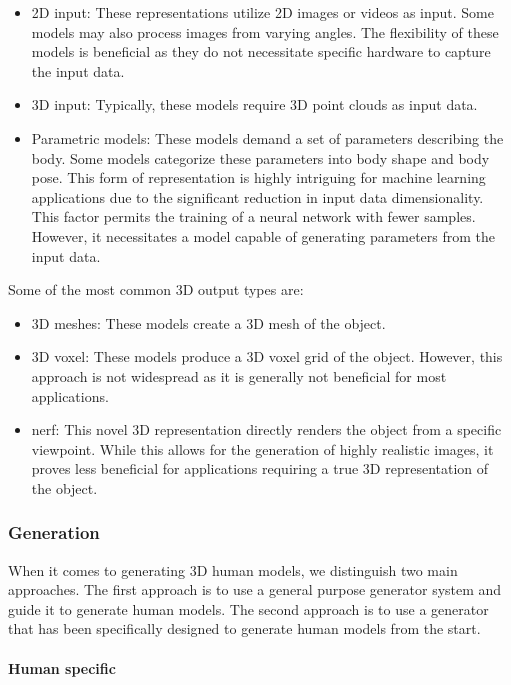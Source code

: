 \begin{itemize}
	\item 2D input: These representations utilize 2D images or videos as input.
	      Some models may also process images from varying angles. The flexibility
	      of these models is beneficial as they do not necessitate specific hardware
	      to capture the input data.
	\item 3D input: Typically, these models require 3D point clouds as input data.
	\item Parametric models: These models demand a set of parameters describing the body.
	      Some models categorize these parameters into body shape and body pose. This
	      form of representation is highly intriguing for machine learning applications
	      due to the significant reduction in input data dimensionality. This factor
	      permits the training of a neural network with fewer samples. However, it
	      necessitates a model capable of generating parameters from the input data.
\end{itemize}

Some of the most common 3D output types are:

\begin{itemize}
	\item 3D meshes: These models create a 3D mesh of the object.
	\item 3D voxel: These models produce a 3D voxel grid of the object.
	      However, this approach is not widespread as it is generally not
	      beneficial for most applications.
	\item \gls{nerf}: This novel 3D representation directly renders the object
	      from a specific viewpoint. While this allows for the generation of
	      highly realistic images, it proves less beneficial for applications
	      requiring a true 3D representation of the object.
\end{itemize}

\subsubsection{Generation}

When it comes to generating 3D human models, we distinguish two main
approaches. The first approach is to use a general purpose generator system and
guide it to generate human models. The second approach is to use a generator
that has been specifically designed to generate human models from the start.

\paragraph{Human specific}

